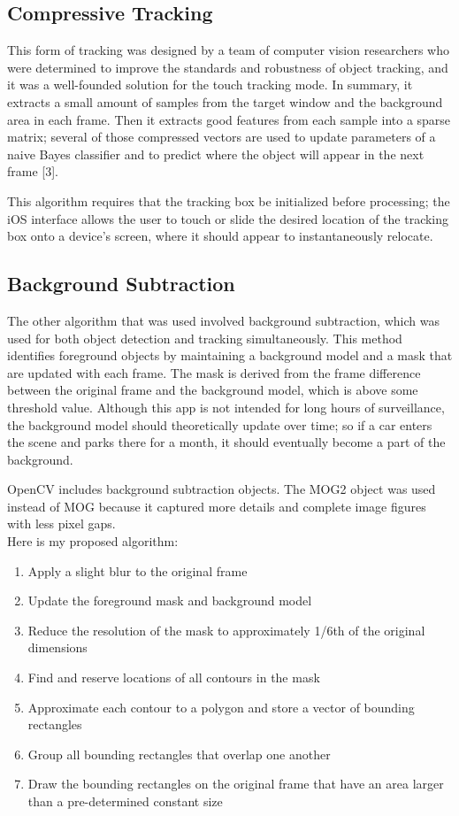 \documentclass[11pt,letterpaper]{article}
\begin{document}
	\subsection*{Compressive Tracking}
	This form of tracking was designed by a team of computer vision researchers who were determined to improve the standards and robustness of object tracking, and it was a well-founded solution for the touch tracking mode. In summary, it extracts a small amount of samples from the target window and the background area in each frame.  Then it extracts good features from each sample into a sparse matrix; several of those compressed vectors are used to update parameters of a naive Bayes classifier and to predict where the object will appear in the next frame [3].
	
	This algorithm requires that the tracking box be initialized before processing; the iOS interface allows the user to touch or slide the desired location of the tracking box onto a device's screen, where it should appear to instantaneously relocate. \\
	
	\subsection*{Background Subtraction}
	The other algorithm that was used involved background subtraction, which was used for both object detection and tracking simultaneously. This method identifies foreground objects by maintaining a background model and a mask that are updated with each frame. The mask is derived from the frame difference between the original frame and the background model, which is above some threshold value. Although this app is not intended for long hours of surveillance, the background model should theoretically update over time; so if a car enters the scene and parks there for a month, it should eventually become a part of the background. 
	
	OpenCV includes background subtraction objects. The MOG2 object was used instead of MOG because it captured more details and complete image figures with less pixel gaps. \\
	
	Here is my proposed algorithm:
	
	 \begin{enumerate}
	 	\item Apply a slight blur to the original frame
	 	\item Update the foreground mask and background model
	 	\item Reduce the resolution of the mask to approximately 1/6th of the original dimensions
	 	\item Find and reserve locations of all contours in the mask
	 	\item Approximate each contour to a polygon and store a vector of bounding rectangles
	 	\item Group all bounding rectangles that overlap one another
	 	\item Draw the bounding rectangles on the original frame that have an area larger than a pre-determined constant size
	 \end{enumerate}
	
\end{document}
